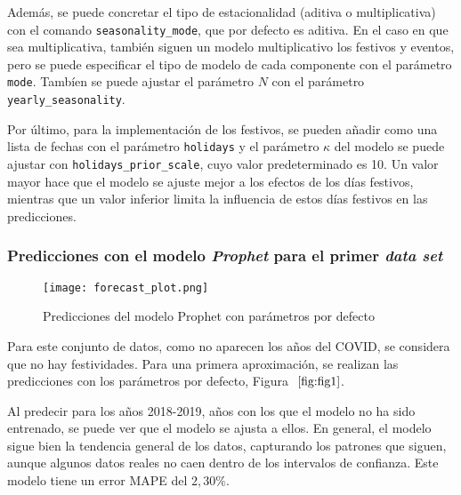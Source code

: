 \documentclass[12pt,twoside]{article}
\begin{document}
Además, se puede concretar el tipo de estacionalidad (aditiva o multiplicativa) con el comando \texttt{seasonality\_mode}, que por defecto es aditiva. En el caso en que sea multiplicativa, también siguen un modelo multiplicativo los festivos y eventos, pero se puede especificar el tipo de modelo de cada componente con el parámetro \texttt{mode}. Tambíen se puede ajustar el parámetro $N$ con el parámetro \texttt{yearly\_seasonality}.

Por último, para la implementación de los festivos, se pueden añadir como una lista de fechas con el parámetro \texttt{holidays} y el parámetro $\kappa$ del modelo se puede ajustar con \texttt{holidays\_prior\_scale}, cuyo valor predeterminado es 10. Un valor mayor hace que el modelo se ajuste mejor a los efectos de los días festivos, mientras que un valor inferior limita la influencia de estos días festivos en las predicciones.

\subsubsection{Predicciones con el modelo \textit{Prophet} para el primer \textit{data set}}\label{sec:8}

\begin{figure}[h]
    \centering
    \texttt{[image: forecast\_plot.png]}
    \caption{Predicciones del modelo Prophet con parámetros por defecto} 
    \label{fig:fig1}
\end{figure}

Para este conjunto de datos, como no aparecen los años del COVID, se considera que no hay festividades. Para una primera aproximación, se realizan las predicciones con los parámetros por defecto, Figura $~\ref{fig:fig1}$.



Al predecir para los años 2018-2019, años con los que el modelo no ha sido entrenado, se puede ver que el modelo se ajusta a ellos. En general, el modelo sigue bien la tendencia general de los datos, capturando los patrones que siguen, aunque algunos datos reales no caen dentro de los intervalos de confianza. Este modelo tiene un error MAPE del $2,30\%$.
\end{document}
